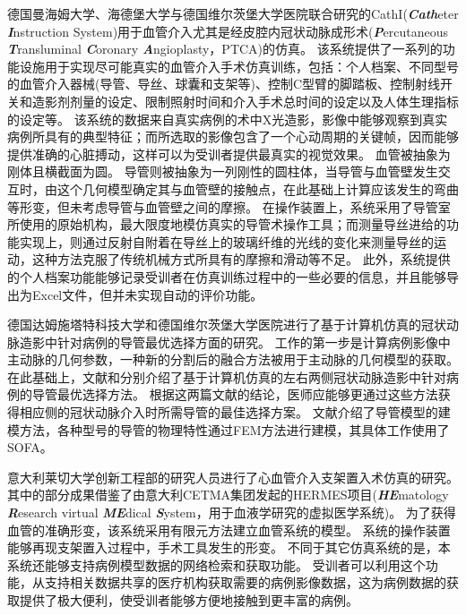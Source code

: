 德国曼海姆大学、海德堡大学与德国维尔茨堡大学医院联合研究的CathI(\textbf{\textit{Cath}}eter \textbf{\textit{I}}nstruction System)用于血管介入尤其是经皮腔内冠状动脉成形术(\textbf{\textit{P}}ercutaneous \textbf{\textit{T}}ransluminal \textbf{\textit{C}}oronary \textbf{\textit{A}}ngioplasty，PTCA)的仿真\cite{rebholz2004cathi}\cite{Hoefer2002CathI}。
该系统提供了一系列的功能设施用于实现尽可能真实的血管介入手术仿真训练\cite{rebholz2004cathi}，包括：个人档案、不同型号的血管介入器械(导管、导丝、球囊和支架等)、控制C型臂的脚踏板、控制射线开关和造影剂剂量的设定、限制照射时间和介入手术总时间的设定以及人体生理指标的设定等。
该系统的数据来自真实病例的术中X光造影，影像中能够观察到真实病例所具有的典型特征；而所选取的影像包含了一个心动周期的关键帧，因而能够提供准确的心脏搏动，这样可以为受训者提供最真实的视觉效果。
血管被抽象为刚体且横截面为圆\cite{Hoefer2002CathI}。
导管则被抽象为一列刚性的圆柱体，当导管与血管壁发生交互时，由这个几何模型确定其与血管壁的接触点，在此基础上计算应该发生的弯曲等形变，但未考虑导管与血管壁之间的摩擦\cite{rebholz2004cathi}。
在操作装置上，系统采用了导管室所使用的原始机构，最大限度地模仿真实的导管术操作工具；而测量导丝进给的功能实现上，则通过反射自附着在导丝上的玻璃纤维的光线的变化来测量导丝的运动，这种方法克服了传统机械方式所具有的摩擦和滑动等不足\cite{Hoefer2002CathI}。
此外，系统提供的个人档案功能能够记录受训者在仿真训练过程中的一些必要的信息，并且能够导出为Excel文件，但并未实现自动的评价功能\cite{rebholz2004cathi}。

德国达姆施塔特科技大学和德国维尔茨堡大学医院进行了基于计算机仿真的冠状动脉造影中针对病例的导管最优选择方面的研究\cite{Rahman2012Darmstadt}\cite{Rahman2011bDarmstadt}\cite{Rahman2011aDarmstadt}\cite{Flehmann2011Darmstadt}。
工作的第一步是计算病例影像中主动脉的几何参数，一种新的分割后的融合方法被用于主动脉的几何模型的获取\cite{Flehmann2011Darmstadt}。
在此基础上，文献\cite{Rahman2011bDarmstadt}和\cite{Rahman2011aDarmstadt}分别介绍了基于计算机仿真的左右两侧冠状动脉造影中针对病例的导管最优选择方法。
根据这两篇文献的结论，医师应能够更通过这些方法获得相应侧的冠状动脉介入时所需导管的最佳选择方案。
文献\cite{Rahman2012Darmstadt}介绍了导管模型的建模方法，各种型号的导管的物理特性通过FEM方法进行建模，其具体工作使用了SOFA\cite{Allard2007SOFA}。

意大利莱切大学创新工程部的研究人员进行了心血管介入支架置入术仿真的研究\cite{aloisio2006HERMES}\cite{aloisio2006aHERMES}\cite{aloisio2005HERMES}\cite{aloisio2004HERMES}。
其中的部分成果借鉴了由意大利CETMA集团发起的HERMES项目(\textbf{\textit{HE}}matology \textbf{\textit{R}}esearch virtual \textbf{\textit{ME}}dical \textbf{\textit{S}}ystem，用于血液学研究的虚拟医学系统)\cite{aloisio2005HERMES}。
为了获得血管的准确形变，该系统采用有限元方法建立血管系统的模型\cite{aloisio2004HERMES}。
系统的操作装置能够再现支架置入过程中，手术工具发生的形变\cite{aloisio2005HERMES}。
不同于其它仿真系统的是，本系统还能够支持病例模型数据的网络检索和获取功能\cite{aloisio2006aHERMES}\cite{aloisio2006HERMES}。
受训者可以利用这个功能，从支持相关数据共享的医疗机构获取需要的病例影像数据，这为病例数据的获取提供了极大便利，使受训者能够方便地接触到更丰富的病例。


